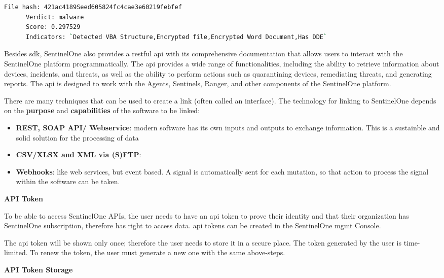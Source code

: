 \begin{lstlisting}[language=bash]
      File hash: 421ac4189Seed605824fc4cae3e60219febfef
      Verdict: malware
      Score: 0.297529
      Indicators: `Detected VBA Structure,Encrypted file,Encrypted Word Document,Has DDE`
\end{lstlisting}

\begin{multicols}{2}
      Besides \acrshort{sdk}, SentinelOne also provides a \acrshort{rest}ful \acrshort{api} with its comprehensive documentation
      that allows users to interact with the SentinelOne platform programmatically. The \acrshort{api} provides a wide range of
      functionalities, including the ability to retrieve information about devices, incidents, and threats, as well as the ability
      to perform actions such as quarantining devices, remediating threats, and generating reports. The \acrshort{api} is designed
      to work with the Agents, Sentinels, Ranger, and other components of the SentinelOne platform.

      There are many techniques that can be used to create a link (often called an interface). The technology for linking to
      SentinelOne depends on the \textbf{purpose} and \textbf{capabilities} of the software to be linked:
      \begin{itemize}
            \item \textbf{REST, SOAP API/ Webservice}: modern software has its own inputs and outputs to exchange information.
                  This is a sustainble and solid solution for the processing of data
            \item \textbf{CSV/XLSX and XML via (S)FTP}:
            \item \textbf{Webhooks}: like web services, but event based. A signal is automatically sent for each mutation,
                  so that action to process the signal within the software can be taken.
      \end{itemize}

      \textbf{API Token}

      To be able to access SentinelOne APIs, the user needs to have an \acrshort{api} token to prove their identity and that their
      organization has SentinelOne subscription, therefore has right to access data. \acrshort{api} tokens can be created in the
      SentinelOne \acrshort{mgmt} Console.

      The \acrshort{api} token will be shown only once; therefore the user needs to store it in a secure place. The token
      generated by the user is time-limited. To renew the token, the user must generate a new one with the same above-steps.

      \textbf{API Token Storage}
\end{multicols}

